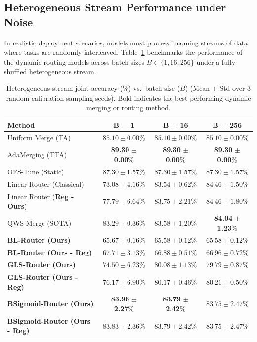 \subsection{Heterogeneous Stream Performance under Noise}
In realistic deployment scenarios, models must process incoming streams of data where tasks are randomly interleaved. Table~\ref{tab:heterogeneous_results} benchmarks the performance of the dynamic routing models across batch sizes $B \in \{1, 16, 256\}$ under a fully shuffled heterogeneous stream.

\begin{table}[h]
\centering
\caption{Heterogeneous stream joint accuracy (\%) vs.\ batch size ($B$) (Mean $\pm$ Std over 3 random calibration-sampling seeds). Bold indicates the best-performing dynamic merging or routing method.}
\label{tab:heterogeneous_results}
\vskip 0.15in
\begin{tabular}{lccc}
\toprule
Method & B = 1 & B = 16 & B = 256 \\
\midrule
Uniform Merge (TA) & $85.10 \pm 0.00$\% & $85.10 \pm 0.00$\% & $85.10 \pm 0.00$\% \\
AdaMerging (TTA) & \textbf{89.30} $\pm$ \textbf{0.00}\% & \textbf{89.30} $\pm$ \textbf{0.00}\% & \textbf{89.30} $\pm$ \textbf{0.00}\% \\
OFS-Tune (Static) & $87.30 \pm 1.57$\% & $87.30 \pm 1.57$\% & $87.30 \pm 1.57$\% \\
\midrule
Linear Router (Classical) & $73.08 \pm 4.16$\% & $83.54 \pm 0.62$\% & $84.46 \pm 1.50$\% \\
Linear Router (\textbf{Reg - Ours}) & $77.79 \pm 6.64$\% & $83.75 \pm 2.21$\% & $84.46 \pm 1.80$\% \\
QWS-Merge (SOTA) & $83.29 \pm 0.36$\% & $83.58 \pm 1.20$\% & \textbf{84.04} $\pm$ \textbf{1.23}\% \\
\midrule
\textbf{BL-Router (Ours)} & $65.67 \pm 0.16$\% & $65.58 \pm 0.12$\% & $65.58 \pm 0.12$\% \\
\textbf{BL-Router (Ours - Reg)} & $67.71 \pm 3.13$\% & $66.88 \pm 0.51$\% & $66.96 \pm 0.72$\% \\
\textbf{GLS-Router (Ours)} & $74.50 \pm 6.23$\% & $80.08 \pm 1.13$\% & $79.79 \pm 0.87$\% \\
\textbf{GLS-Router (Ours - Reg)} & $76.17 \pm 6.90$\% & $80.17 \pm 0.46$\% & $80.21 \pm 0.50$\% \\
\textbf{BSigmoid-Router (Ours)} & \textbf{83.96} $\pm$ \textbf{2.27}\% & \textbf{83.79} $\pm$ \textbf{2.42}\% & $83.75 \pm 2.47$\% \\
\textbf{BSigmoid-Router (Ours - Reg)} & $83.83 \pm 2.36$\% & $83.79 \pm 2.42$\% & $83.75 \pm 2.47$\% \\
\bottomrule
\end{tabular}
\end{table}

